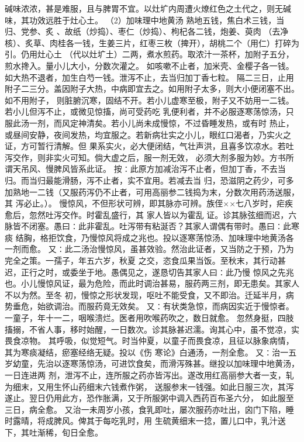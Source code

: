 \documentclass[a4paper,12pt,UTF8,twoside]{ctexbook}
\begin{document}
碱味浓浓，甚是难服，且与脾胃不宜。以灶圹内周遭火燎红色之土代之，则无碱味，其功效远胜于灶心土。 
（2）加味理中地黄汤 
熟地五钱，焦白术三钱，当归、党参、炙 、故纸（炒捣）、枣仁（炒捣）、枸杞各二钱，炮姜、萸肉 
（去净核）、炙草、肉桂各一钱，生姜三片，红枣三枚（捭开），胡桃二个（用仁）打碎为引。仍用灶心土 
（代以灶圹土）二两，煮水煎药。取浓汁一茶杯，加附子五分，煎水搀入。量小儿大小，分数次灌之。 
如咳嗽不止者，加米壳、金樱子各一钱。如大热不退者，加生白芍一钱。泄泻不止，去当归加丁香七粒。 
隔二三日，止用附子二三分。盖因附子大热，中病即宜去之。如用附子太多，则大小便闭塞不出。如不用附子， 
则脏腑沉寒，固结不开。若小儿虚寒至极，附子又不妨用一二钱。若小儿但泻不止，或微见惊搐，尚可受药吃 
乳便利者，并不必服逐寒荡惊汤，只服此汤一剂，而风定神清矣。若小儿尚未成慢惊，不过昏睡发热，或有时 
热止，或昼间安静，夜间发热，均宜服之。若新病壮实之小儿，眼红口渴者，乃实火之证，方可暂行清解。但 
果系实火，必大便闭结，气壮声洪，且喜多饮凉水。若吐泻交作，则非实火可知。倘大虚之后，服一剂无效， 
必须大剂多服为妙。方书所谓天吊风、慢脾风皆系此证。 
按∶此原方加减治泻不止者，但加丁香，不去当归。而当归最能滑肠，泻不止者，实不宜用。若减去当 
归，恐滋阴之药少，可多加熟地一二钱（又服药泻仍不止者，可用高丽参二钱捣为末，分数次用药汤送服，其 
泻必止。）。 
慢惊风，不但形状可辨，即其脉亦可辨。族侄××七八岁时，疟疾愈后，忽然吐泻交作。时霍乱盛行，其 
家人皆以为霍乱 
证。诊其脉弦细而迟，六脉皆不闭塞。愚曰∶此非霍乱。吐泻带有粘涎否？其家人谓偶有带时。愚曰∶此寒痰 
结胸，格拒饮食，乃慢惊风将成之兆也。投以逐寒荡惊汤、加味理中地黄汤各一剂而愈。 
又∶此二汤治慢惊风，虽甚效验。然治此证者，又当防之于预，乃为完全之策。一孺子，年五六岁，秋夏 
之交，恣食瓜果当饭。至秋末，其行动甚迟，正行之时，或委坐于地。愚偶见之，遂恳切告其家人曰∶此乃慢 
惊风之先兆也。小儿慢惊风证，最为危险，而此时调治甚易，服药两三剂，即无患矣。其家人不以为然。至冬 
初，慢惊之形状发现，呕吐不能受食，又不即治。迁延半月，病势垂危，始欲调治。而服药竟无效矣。 
又∶有状类急惊，而病因实近于慢惊者。一童子，年十一二，咽喉溃烂。医者用吹喉药吹之，数日就愈。 
忽然身挺，四肢搐搦，不省人事，移时始醒，一日数次。诊其脉甚迟濡。询其心中，虽不觉凉，实畏食凉物。 
其呼吸，似觉短气。时当仲夏，以童子而畏食凉，且征以脉象病情，其为寒痰凝结，瘀塞经络无疑。投以《伤 
寒论》白通汤，一剂全愈。 
又∶治一五岁幼童，先治以逐寒荡惊汤，可进饮食矣，而滑泻殊甚。继投以加味理中地黄汤，一日连进两 
剂，泄泻不止，连所服之药亦皆泻出。遂改用红高丽参大者一支，轧为细末，又用生怀山药细末六钱煮作粥， 
送服参末一钱强。如此日服三次，其泻遂止。翌日仍用此方，恐作胀满，又于所服粥中调入西药百布圣六分， 
如此服至三日，病全愈。 
又治一未周岁小孩，食乳即吐，屡次服药亦吐出，囟门下陷，睡时露晴，将成脾风。俾其于每吃乳时，用 
生硫黄细末一捻，置儿口中，乳汁送下，其吐渐稀，旬日全愈。 
\end{document}
